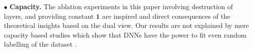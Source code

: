 $\bullet$ \textbf{Capacity.} The ablation experiments in this paper involving destruction of layers, and providing constant $\mathbf{1}$ are inspired and direct consequences of the theoretical insights based on the dual view. Our results are not explained by mere capacity based studies which show that DNNs have the power to fit even random labelling of the dataset \citep{ben}.

\begin{comment}
Learning in gates is also takes away the importance of looking at NPK at randomised initialisation, a reason why we did not pursue the question of analysing the spectrum of NPK at randomised initialisation in the limit of infinite width/depth (like \cite{disentangling,spectra}) or design a pure kernel method (like \cite{arora2019,fcgp,convgp}) or its constancy as in \cite{belkin}. The NTK and NPFs are related at an algebraic level (see \Cref{prop:ntknew}), i.e., the relation holds for any width, depth, and initialisation, and not just in limiting case. Also, our result that convolutions with pooling make the NPFs rotationally invariant is again algebraic and holds for finite width/depth as opposed to an asymptotic analytical characterisation of pooling \cite{disentangle}. Similarly, the sum of product structure of ResNets is also an algebraic result as opposed to \cite{meanres} which shows that ResNets are an ensemble of shallow architecture by ignoring certain higher order terms in the mean-field analysis. \cite{loss} study the dynamics of NTK empirically and show that its performance matches that of full network training in $15\%$ to $45\%$ of training time. The fact that NPF/NPK/gates learning is continuous ($\text{NTK}^{\text{gate-learn}}$ dictates the dynamics of the gates) and that learnt NPF/NPK/gates perform as well as the original DNN was already empirically shown by \cite{npk}, and our experiments add strength for the same. 


\end{comment}
